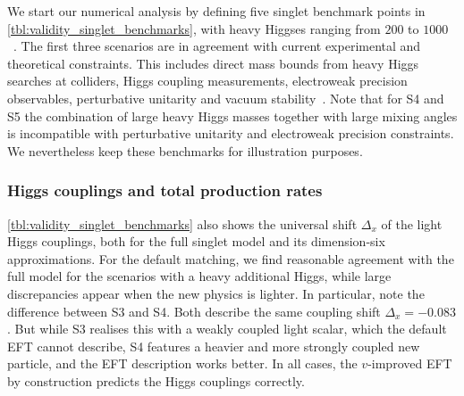 We start our numerical analysis by defining five singlet benchmark
points in \autoref{tbl:validity_singlet_benchmarks}, with heavy Higgses
ranging from $200$ to $1000$~\gev. The first three scenarios are in
agreement with current experimental and theoretical constraints.  This
includes direct mass bounds from heavy Higgs searches at colliders,
Higgs coupling measurements, electroweak precision observables,
perturbative unitarity and vacuum stability~\cite{Pruna:2013bma,
  Lopez-Val:2014jva, Robens:2015gla}. Note that for S4 and S5 the
combination of large heavy Higgs masses together with large mixing
angles is incompatible with perturbative unitarity and electroweak
precision constraints.  We nevertheless keep these benchmarks for
illustration purposes.



\subsubsection{Higgs couplings and total production rates}

\autoref{tbl:validity_singlet_benchmarks} also shows the universal
shift $\Delta_x$ of the light Higgs couplings, both for the full
singlet model and its dimension-six approximations. For the default
matching, we find reasonable agreement with the full model for the
scenarios with a heavy additional Higgs, while large discrepancies
appear when the new physics is lighter. In particular, note the
difference between S3 and S4. Both describe the same coupling shift
$\Delta_x = - 0.083$. But while S3 realises this with a weakly coupled
light scalar, which the default EFT cannot describe, S4 features a
heavier and more strongly coupled new particle, and the EFT
description works better.  In all cases, the $v$-improved EFT by
construction predicts the Higgs couplings correctly. 

